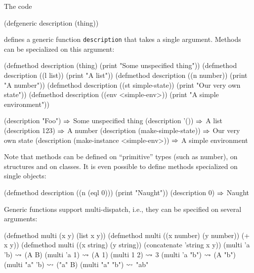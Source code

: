 \documentclass[a4paper]{amsart}
\begin{document}
The code
\begin{Code}
  (defgeneric description (thing))
\end{Code}
defines a generic function \texttt{description} that takes a single
argument.  Methods can be specialized on this argument:
\begin{Code}
  (defmethod description (thing)
    (print "Some unspecified thing"))
  (defmethod description ((l list))
    (print "A list"))
  (defmethod description ((n number))
    (print "A number"))
  (defmethod description ((st simple-state))
    (print "Our very own state"))
  (defmethod description ((env <simple-env>))
    (print "A simple environment"))

  (description "Foo")                        $\Rightarrow$ Some unspecified thing
  (description '())                          $\Rightarrow$ A list
  (description 123)                          $\Rightarrow$ A number
  (description (make-simple-state))          $\Rightarrow$ Our very own state
  (description (make-instance <simple-env>)) $\Rightarrow$ A simple environment
\end{Code}
Note that methods can be defined on ``primitive'' types (such as
number), on structures and on classes.  It is even possible to define
methods specialized on single objects:
\begin{Code}
  (defmethod description ((n (eql 0)))
    (print "Naught"))
  (description 0)                            $\Rightarrow$ Naught
\end{Code}

Generic functions support multi-dispatch, i.e., they can be specified
on several arguments:
\begin{Code}
  (defmethod multi (x y)
    (list x y))
  (defmethod multi ((x number) (y number))
    (+ x y))
  (defmethod multi ((x string) (y string))
    (concatenate 'string x y))
  (multi  'a  'b)                               $\rightsquigarrow$ (A B)
  (multi 'a   1)                                $\rightsquigarrow$ (A 1)
  (multi  1   2)                                $\rightsquigarrow$ 3
  (multi 'a  "b")                               $\rightsquigarrow$ (A "b")
  (multi "a" 'b)                                $\rightsquigarrow$ ("a" B)
  (multi "a" "b")                               $\rightsquigarrow$ "ab"
\end{Code}
\end{document}
